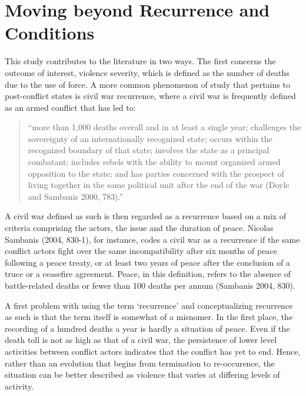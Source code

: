 \documentclass [11pt]{article}
\begin{document}
\section*{Moving beyond Recurrence and Conditions} %

This study contributes to the literature in two ways. The first concerns the outcome of interest, violence severity, which is defined as the number of deaths due to the use of force. A more common phenomenon of study that pertains to post-conflict states is civil war recurrence, where a civil war is frequently defined as an armed conflict that has led to:

\begin{quote}
\small
``more than 1,000 deaths overall and in at least a single year; challenges the sovereignty of an internationally recognized state; occurs within the recognized boundary of that state; involves the state as a principal combatant; includes rebels with the ability to mount organized armed opposition to the state; and has parties concerned with the prospect of living together in the same political unit after the end of the war (Doyle and Sambanis 2000, 783).''
\end{quote}

A civil war defined as such is then regarded as a recurrence based on a mix of criteria comprising the actors, the issue and the duration of peace. Nicolas Sambanis (2004, 830-1), for instance, codes a civil war as a recurrence if the same conflict actors fight over the same incompatibility after six months of peace following a peace treaty, or at least two years of peace after the conclusion of a truce or a ceasefire agreement. Peace, in this definition, refers to the absence of battle-related deaths or fewer than 100 deaths per annum (Sambanis 2004, 830).

A first problem with using the term `recurrence' and conceptualizing recurrence as such is that the term itself is somewhat of a misnomer. In the first place, the recording of a hundred deaths a year is hardly a situation of peace. Even if the death toll is not as high as that of a civil war, the persistence of lower level activities between conflict actors indicates that the conflict has yet to end. Hence, rather than an evolution that begins from termination to re-occurence, the situation can be better described as violence that varies at differing levels of activity.
\end{document}
